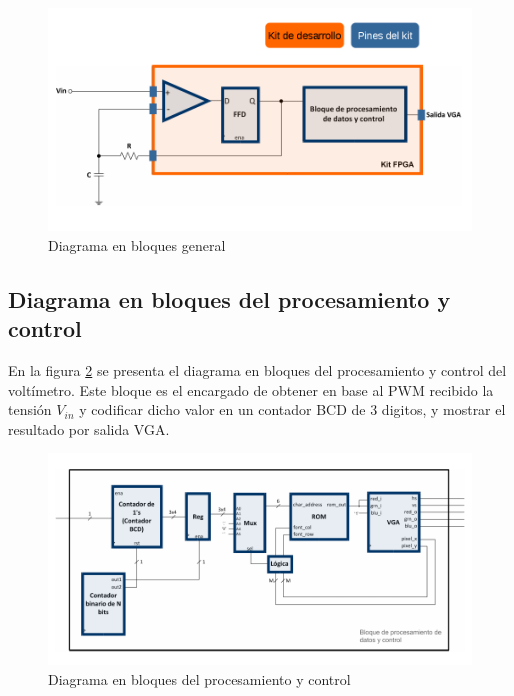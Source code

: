 \documentclass[10pt,spanish,a4paper,openany,notitlepage]{article}
\begin{document}
\begin{figure}[H] %
\begin{center}
\includegraphics[scale=0.5]{./imagenes/bloques_general.png}
\caption{Diagrama en bloques general}
 \label{fig:bloques_general}
\end{center}
\end{figure}

\subsection{Diagrama en bloques del procesamiento y control}

En la figura \ref{fig:bloques_control} se presenta el diagrama en bloques
del procesamiento y control del voltímetro.
Este bloque es el encargado de obtener en base al PWM recibido la tensión
$V_{in}$ y codificar dicho valor en un contador BCD de 3 digitos, y
mostrar el resultado por salida VGA.

\begin{figure}[H] %
\begin{center}
\includegraphics[scale=0.5]{./imagenes/bloques_control.png}
\caption{Diagrama en bloques del procesamiento y control}
 \label{fig:bloques_control}
\end{center}
\end{figure}
\end{document}
